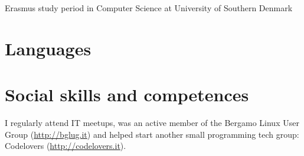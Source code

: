 \documentclass[helvetica,narrow,english,booktabs,a4paper]{moderncv}
\begin{document}
  Erasmus study period in Computer Science at University of Southern Denmark\\

  \section{Languages}

  \section{Social skills and competences}
  I regularly attend IT meetups, was an active member of the Bergamo Linux User Group (\url{http://bglug.it}) and helped start another small programming tech group: Codelovers (\url{http://codelovers.it}).
\end{document}
